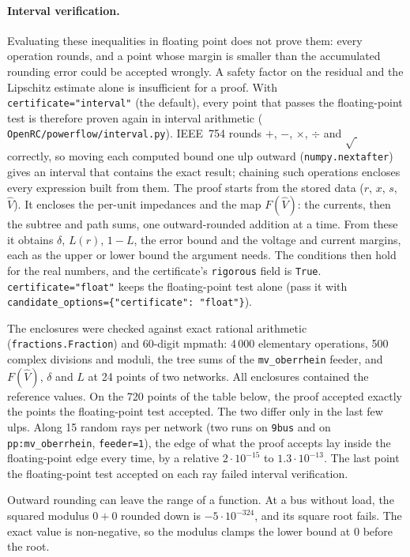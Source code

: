 \documentclass[11pt,a4paper]{report}
\newcommand{\trap}[1]{\begin{warnbox}#1\end{warnbox}}
\newcommand{\code}[1]{\texttt{\small #1}}
\newcommand{\file}[1]{\texttt{\small\color{nbgrey} #1}}
\begin{document}
\paragraph{Interval verification.} Evaluating these inequalities in floating
point does not prove them: every operation rounds, and a point whose margin is
smaller than the accumulated rounding error could be accepted wrongly. A safety
factor on the residual and the Lipschitz estimate alone is insufficient for a
proof. With \code{certificate="interval"} (the default), every point
that passes the floating-point test is therefore proven again in interval
arithmetic (\file{OpenRC/powerflow/interval.py}). IEEE~754 rounds $+$, $-$,
$\times$, $\div$ and $\sqrt{\ }$ correctly, so moving each computed bound one
ulp outward (\code{numpy.nextafter}) gives an interval that contains the exact
result; chaining such operations encloses every expression built from them.
The proof starts from the stored data ($r$, $x$, $s$, $\hat V$). It encloses
the per-unit impedances and the map $F(\hat V)$: the currents, then the subtree
and path sums, one outward-rounded addition at a time. From these it obtains
$\delta$, $L(r)$, $1 - L$, the error bound and the voltage and current margins,
each as the upper or lower bound the argument needs. The conditions then hold
for the real numbers, and the certificate's \code{rigorous} field is
\code{True}. \code{certificate="float"} keeps the floating-point test alone
(pass it with \code{candidate\_options=\{"certificate": "float"\}}).

The enclosures were checked against exact rational arithmetic
(\code{fractions.Fraction}) and 60-digit mpmath: 4\,000 elementary operations,
500 complex divisions and moduli, the tree sums of the \code{mv\_oberrhein} feeder, and
$F(\hat V)$, $\delta$ and $L$ at 24 points of two networks. All enclosures
contained the reference values. On the 720 points of the table below, the
proof accepted exactly the points the
floating-point test accepted. The two differ only in the last few ulps. Along 15
random rays per network (two runs on \code{9bus} and on \code{pp:mv\_oberrhein},
\code{feeder=1}), the edge
of what the proof accepts lay inside the floating-point edge every time, by a
relative $2\cdot10^{-15}$ to $1.3\cdot10^{-13}$. The last point the
floating-point test accepted on each ray failed interval verification.

\trap{Outward rounding can leave the range of a function. At a bus without
load, the squared modulus $0 + 0$ rounded down is $-5\cdot10^{-324}$, and its
square root fails. The exact value is non-negative, so the modulus clamps the
lower bound at 0 before the root.}
\end{document}

